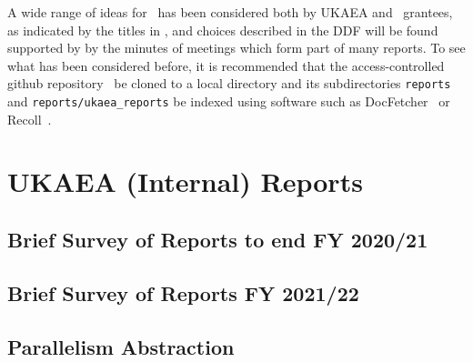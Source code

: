 A wide range of ideas for \nep \ has been considered both by UKAEA and \nep \ grantees,
as indicated by the titles in , and choices described in the DDF
will be found supported by by the minutes of meetings which form
part of many reports. To see what has been considered before, it is recommended that 
the access-controlled github repository~\cite{xpndocswebsite} be cloned to a
local directory and its subdirectories {\tt reports} and {\tt reports/ukaea\_reports}
be indexed using software such as DocFetcher~\cite{docfetcherwebsite} or Recoll~\cite{recollwebsite}.
\section{UKAEA (Internal) Reports}\label{sec:DJF_internal}


\subsection{Brief Survey of Reports to end FY 2020/21}\label{sec:summary}

\subsection{Brief Survey of Reports FY 2021/22}\label{sec:summary22}


 
\subsection{Parallelism Abstraction}\label{sec:parabstr}


